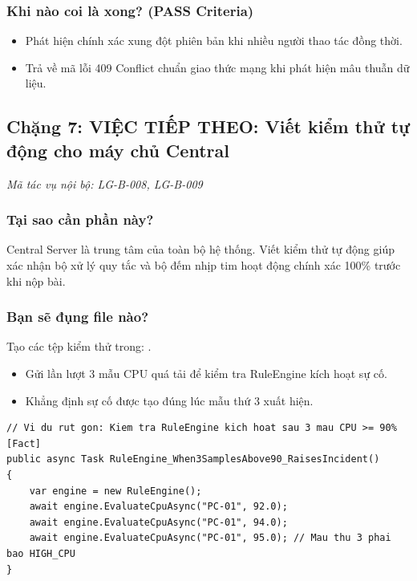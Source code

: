 \documentclass[12pt,a4paper]{article}
\begin{document}
\subsubsection{Khi nào coi là xong? (PASS Criteria)}
\begin{itemize}
  \item Phát hiện chính xác xung đột phiên bản khi nhiều người thao tác đồng thời.
  \item Trả về mã lỗi 409 Conflict chuẩn giao thức mạng khi phát hiện mâu thuẫn dữ liệu.
\end{itemize}

\subsection{Chặng 7: VIỆC TIẾP THEO: Viết kiểm thử tự động cho máy chủ Central}
{\footnotesize\color{lgGray}\textit{Mã tác vụ nội bộ: LG-B-008, LG-B-009}}\par
\vspace{2mm}

\subsubsection{Tại sao cần phần này?}
Central Server là trung tâm của toàn bộ hệ thống. Viết kiểm thử tự động giúp xác nhận bộ xử lý quy tắc và bộ đếm nhịp tim hoạt động chính xác 100\% trước khi nộp bài.

\subsubsection{Bạn sẽ đụng file nào?}
Tạo các tệp kiểm thử trong: .

\begin{orientationbox}
\begin{itemize}[leftmargin=1.5em, itemsep=1pt]
  \item Gửi lần lượt 3 mẫu CPU quá tải để kiểm tra RuleEngine kích hoạt sự cố.
  \item Khẳng định sự cố được tạo đúng lúc mẫu thứ 3 xuất hiện.
\end{itemize}
\end{orientationbox}

\begin{lstlisting}[language=CSharp, caption={Ví dụ rút gọn: Kiểm thử đơn vị cho bộ xử lý quy tắc RuleEngine}]
// Vi du rut gon: Kiem tra RuleEngine kich hoat sau 3 mau CPU >= 90%
[Fact]
public async Task RuleEngine_When3SamplesAbove90_RaisesIncident()
{
    var engine = new RuleEngine();
    await engine.EvaluateCpuAsync("PC-01", 92.0);
    await engine.EvaluateCpuAsync("PC-01", 94.0);
    await engine.EvaluateCpuAsync("PC-01", 95.0); // Mau thu 3 phai bao HIGH_CPU
}
\end{lstlisting}
\end{document}
